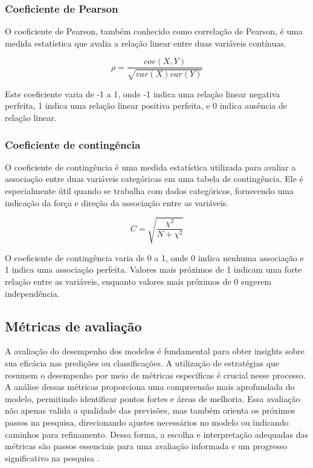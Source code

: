 \subsubsection{Coeficiente de Pearson}

O coeficiente de Pearson, também conhecido como correlação de Pearson, é uma medida estatística 
que avalia a relação linear entre duas variáveis contínuas.

\begin{equation}
    \rho = \frac{cov(X, Y)}{\sqrt{var(X)var(Y)}}
\end{equation}

Este coeficiente varia de -1 a 1, onde -1 indica uma relação linear negativa perfeita, 
1 indica uma relação linear positiva perfeita, e 0 indica ausência de relação linear.

\subsubsection{Coeficiente de contingência}

O coeficiente de contingência é uma medida estatística utilizada para avaliar a associação
entre duas variáveis categóricas em uma tabela de contingência. Ele é especialmente útil 
quando se trabalha com dados categóricos, fornecendo uma indicação da força e direção da associação entre as variáveis.

\begin{equation}
  C = \sqrt{\frac{\chi^2}{N + \chi^2}}
\end{equation}

O coeficiente de contingência varia de 0 a 1, onde 0 indica nenhuma associação e 1 indica uma associação perfeita. 
Valores mais próximos de 1 indicam uma forte relação entre as variáveis, enquanto valores mais próximos de 0 sugerem independência.

\subsection{Métricas de avaliação}

A avaliação do desempenho dos modelos é fundamental para obter insights sobre sua eficácia nas predições ou classificações. 
A utilização de estratégias que resumem o desempenho por meio de métricas específicas é crucial nesse processo.
A análise dessas métricas proporciona uma compreensão mais aprofundada do modelo, permitindo identificar pontos 
fortes e áreas de melhoria. Essa avaliação não apenas valida a qualidade das previsões, mas também orienta os próximos
passos na pesquisa, direcionando ajustes necessários no modelo ou indicando caminhos para refinamento. 
Dessa forma, a escolha e interpretação adequadas das métricas são passos essenciais para uma avaliação informada 
e um progresso significativo na pesquisa \cite{geron2019hands}.

